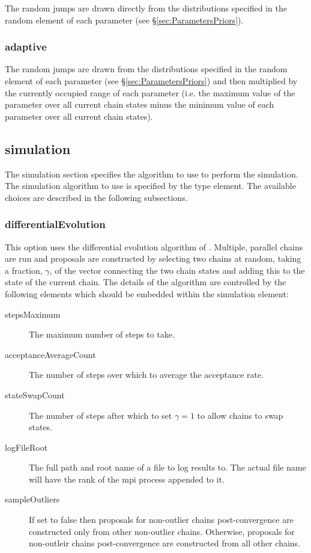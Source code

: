 The random jumps are drawn directly from the distributions specified in the {\normalfont \ttfamily random} element of each parameter (see \S\ref{sec:ParametersPriors}).

\subsubsection{{\normalfont \ttfamily adaptive}}

The random jumps are drawn from the distributions specified in the {\normalfont \ttfamily random} element of each parameter (see \S\ref{sec:ParametersPriors}) and then multiplied by the currently occupied range of each parameter (i.e. the maximum value of the parameter over all current chain states minus the minimum value of each parameter over all current chain states).

\subsection{{\normalfont \ttfamily simulation}}

The {\normalfont \ttfamily simulation} section specifies the algorithm to use to perform the simulation. The simulation algorithm to use is specified by the {\normalfont \ttfamily type} element. The available choices are described in the following subsections.

\subsubsection{{\normalfont \ttfamily differentialEvolution}}

This option uses the differential evolution algorithm of \cite{terr_braak_markov_2006}. Multiple, parallel chains are run and proposals are constructed by selecting two chains at random, taking a fraction, $\gamma$, of the vector connecting the two chain states and adding this to the state of the current chain. The details of the algorithm are controlled by the following elements which should be embedded within the {\normalfont \ttfamily simulation} element:
\begin{description}
\item[{\normalfont \ttfamily stepsMaximum}] The maximum number of steps to take.
\item[{\normalfont \ttfamily acceptanceAverageCount}] The number of steps over which to average the acceptance rate.
\item[{\normalfont \ttfamily stateSwapCount}] The number of steps after which to set $\gamma=1$ to allow chains to swap states.
\item[{\normalfont \ttfamily logFileRoot}] The full path and root name of a file to log results to. The actual file name will have the rank of the \gls{mpi} process appended to it.
\item[{\normalfont \ttfamily sampleOutliers}] If set to {\normalfont \ttfamily false} then proposals for non-outlier chains post-convergence are constructed only from other non-outlier chains. Otherwise, proposals for non-outleir chains post-convergence are constructed from all other chains.
\end{description}

